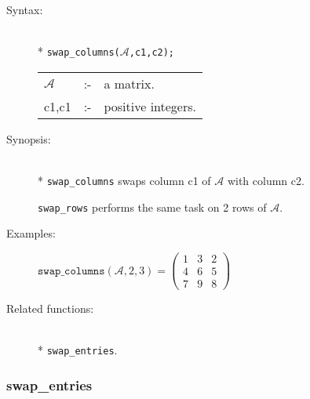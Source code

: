 \begin{description}
\item[Syntax:]\mbox{}\\*
\texttt{swap\_columns($\mathcal{A}$,c1,c2);}\\[2mm]
\begin{tabular}{l l l}
$\mathcal{A}$ &:-& a matrix. \\
c1,c1      &:-& positive integers.
\end{tabular}

\item[Synopsis:]\mbox{}\\*
\texttt{swap\_columns} swaps column c1 of $\mathcal{A}$ with column c2.

\texttt{swap\_rows} performs the same task on 2 rows of $\mathcal{A}$.

\item[Examples:]
\begin{flushleft}
\(
\texttt{swap\_columns}(\mathcal{A},2,3) =
        \begin{pmatrix} 1 & 3 & 2 \\ 4 & 6 & 5 \\ 7 & 9 & 8 \end{pmatrix}
\)
\end{flushleft}

\item[Related functions:]\mbox{}\\*
\texttt{swap\_entries}.
\end{description}


\subsubsection{swap\_entries}
\label{linalg:swap_entries}

